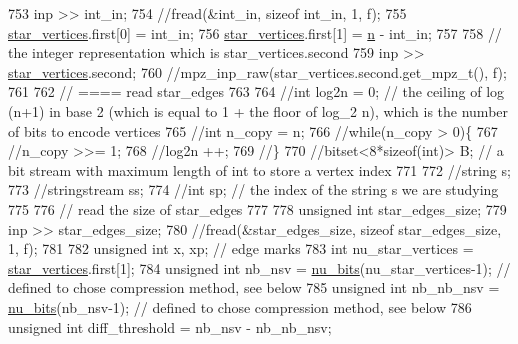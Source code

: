 \begin{DoxyCode}
753   inp >> int\_in;
754   \textcolor{comment}{//fread(&int\_in, sizeof int\_in, 1, f);}
755   \hyperlink{classmarked__graph__compressed_a7a4ced4586e2e353f9076bd447df5208}{star\_vertices}.first[0] = int\_in;
756   \hyperlink{classmarked__graph__compressed_a7a4ced4586e2e353f9076bd447df5208}{star\_vertices}.first[1] = \hyperlink{classmarked__graph__compressed_a8d841016ddb11cfd33748c8deb6277ba}{n} - int\_in;
757 
758   \textcolor{comment}{// the integer representation which is star\_vertices.second}
759   inp >> \hyperlink{classmarked__graph__compressed_a7a4ced4586e2e353f9076bd447df5208}{star\_vertices}.second;
760   \textcolor{comment}{//mpz\_inp\_raw(star\_vertices.second.get\_mpz\_t(), f);}
761 
762   \textcolor{comment}{// ==== read star\_edges}
763 
764   \textcolor{comment}{//int log2n = 0; // the ceiling of log (n+1) in base 2 (which is equal to 1 + the floor of log\_2 n),
       which is the number of bits to encode vertices}
765   \textcolor{comment}{//int n\_copy = n;}
766   \textcolor{comment}{//while(n\_copy > 0)\{}
767   \textcolor{comment}{//n\_copy >>= 1;}
768   \textcolor{comment}{//log2n ++;}
769   \textcolor{comment}{//\}}
770   \textcolor{comment}{//bitset<8*sizeof(int)> B; // a bit stream with maximum length of int to store a vertex index}
771 
772   \textcolor{comment}{//string s;}
773   \textcolor{comment}{//stringstream ss;}
774   \textcolor{comment}{//int sp; // the index of the string s we are studying }
775 
776   \textcolor{comment}{// read the size of star\_edges}
777 
778   \textcolor{keywordtype}{unsigned} \textcolor{keywordtype}{int} star\_edges\_size;
779   inp >> star\_edges\_size;
780   \textcolor{comment}{//fread(&star\_edges\_size, sizeof star\_edges\_size, 1, f);}
781 
782   \textcolor{keywordtype}{unsigned} \textcolor{keywordtype}{int} x, xp; \textcolor{comment}{// edge marks}
783   \textcolor{keywordtype}{int} nu\_star\_vertices = \hyperlink{classmarked__graph__compressed_a7a4ced4586e2e353f9076bd447df5208}{star\_vertices}.first[1];
784   \textcolor{keywordtype}{unsigned} \textcolor{keywordtype}{int} nb\_nsv = \hyperlink{bitstream_8cpp_a9dfce6f51e3febb3973aa3b16c2fecb4}{nu\_bits}(nu\_star\_vertices-1); \textcolor{comment}{// defined to chose compression method, see
       below}
785   \textcolor{keywordtype}{unsigned} \textcolor{keywordtype}{int} nb\_nb\_nsv = \hyperlink{bitstream_8cpp_a9dfce6f51e3febb3973aa3b16c2fecb4}{nu\_bits}(nb\_nsv-1); \textcolor{comment}{// defined to chose compression method, see below}
786   \textcolor{keywordtype}{unsigned} \textcolor{keywordtype}{int} diff\_threshold = nb\_nsv - nb\_nb\_nsv;

\end{DoxyCode}
